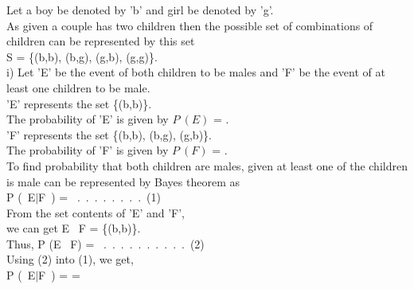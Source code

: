 \documentclass[journal,12pt,twocolumn]{IEEEtran}
\begin{document}
\subsection*{}\\

Let a boy be denoted by 'b' and girl be denoted by 'g'.\\

As given a couple has two children then the possible set of combinations of children can be represented by this set\\ S = \{(b,b), (b,g), (g,b), (g,g)\}.\\


i)    Let 'E' be the event of both children to be males and 'F' be the event of at least one children to be male.\\
    
    'E' represents the set \{(b,b)\}.\\
    
    The probability of 'E' is given by $P\ (E)$ = .\\
    
    'F' represents the set \{(b,b), (b,g), (g,b)\}.\\
    
    The probability of 'F' is given by $P\ (F)$ = .\\
    
    To find probability that both children are males, given at least one of the
    children is male can be represented by Bayes theorem as\\
    
    P (\ E\;$|$\;F\  ) = \ .\ .\ .\ .\ .\ .\ .\ .\ (1)\\
    
    From the set contents of 'E' and 'F',\\ we can get E \cap\ F = \{(b,b)\}.\\
    
    \hspace{25} Thus, P (E \cap\ F) = \ .\ .\ .\ .\ .\ .\ .\ .\ .\ .\ (2)\\
    
    \hspace{25}
    \hspace{3}Using (2) into (1), we get,\\
    
    \hspace{25} P (\ E\;$|$\;F\  ) =  = \\ 
 
\end{document}
